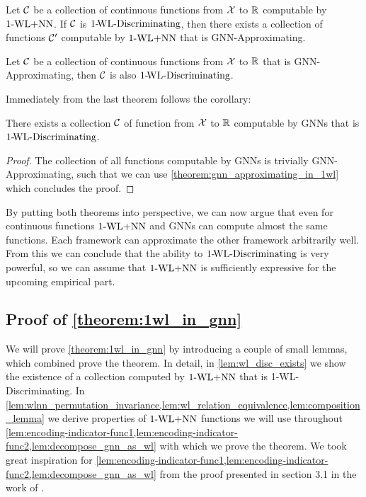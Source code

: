 \begin{theorem}\label{theorem:1wl_in_gnn_approximating}
    Let $\mathcal{C}$ be a collection of continuous functions from $\mathcal{X}$ to $\mathbb{R}$ computable by $\text{1-WL+NN}$. If $\mathcal{C}$ is $\text{1-\!WL-Discriminating}$, then there exists a collection of functions $\mathcal{C}'$ computable by $\text{1-WL+NN}$ that is GNN-Approximating.
\end{theorem}

\begin{theorem}\label{theorem:gnn_approximating_in_1wl}
    Let $\mathcal{C}$ be a collection of continuous functions from $\mathcal{X}$ to $\mathbb{R}$ that is GNN-Approximating, then $\mathcal{C}$ is also $\text{1-\!WL-Discriminating}$.
\end{theorem}

Immediately from the last theorem follows the corollary:
\begin{corollary}
    There exists a collection $\mathcal{C}$ of function from $\mathcal{X}$ to $\mathbb{R}$ computable by GNNs that is $\text{1-\!WL-Discriminating}$.
\end{corollary}

\begin{proof}
    The collection of all functions computable by GNNs is trivially GNN-Approximating, such that we can use \cref*{theorem:gnn_approximating_in_1wl} which concludes the proof.
\end{proof}

By putting both theorems into perspective, we can now argue that even for continuous functions $\text{1-WL+NN}$ and GNNs can compute almost the same functions. Each framework can approximate the other framework arbitrarily well. From this we can conclude that the ability to $\text{1-\!WL-Discriminating}$ is very powerful, so we can assume that $\text{1-WL+NN}$ is sufficiently expressive for the upcoming empirical part.

\subsection{Proof of \cref{theorem:1wl_in_gnn}}
We will prove \cref{theorem:1wl_in_gnn} by introducing a couple of small lemmas, which combined prove the theorem. In detail, in \cref{lem:wl_disc_exists} we show the existence of a collection computed by $\text{1-WL+NN}$ that is 1-\!WL-Discriminating. In \cref{lem:wlnn_permutation_invariance,lem:wl_relation_equivalence,lem:composition_lemma} we derive properties of $\text{1-WL+NN}$ functions we will use throughout \cref{lem:encoding-indicator-func1,lem:encoding-indicator-func2,lem:decompose_gnn_as_wl} with which we prove the theorem.
We took great inspiration for \cref{lem:encoding-indicator-func1,lem:encoding-indicator-func2,lem:decompose_gnn_as_wl} from the proof presented in section 3.1 in the work of \cite{Chen2019}.

